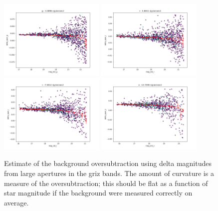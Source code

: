 \begin{figure}
  \begin{center}
    \includegraphics[width=0.45\textwidth]{photometric_calibration_figures/background_oversubtraction_g.png}
    \includegraphics[width=0.45\textwidth]{photometric_calibration_figures/background_oversubtraction_r.png}
    \includegraphics[width=0.45\textwidth]{photometric_calibration_figures/background_oversubtraction_i.png}
    \includegraphics[width=0.45\textwidth]{photometric_calibration_figures/background_oversubtraction_z.png}
  \end{center}
  \caption{Estimate of the background oversubtraction using delta magnitudes
    from large apertures in the griz bands.  The amount of curvature is a measure
    of the oversubtraction; this should be flat as a function of star magnitude
    if the background were measured correctly on average.}
\end{figure}

